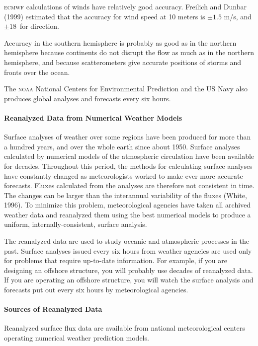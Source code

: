 \textsc{ecmwf} calculations of winds have relatively good
accuracy. Freilich and Dunbar (1999)
estimated that the accuracy for wind speed at 10 meters is $\pm 1.5$
m/s, and $\pm 18$\degrees\ for direction.

Accuracy in the southern hemisphere is probably as good as in the
northern hemisphere because continents do not disrupt the flow as much
as in the northern hemisphere, and because
scatterometers give accurate positions of storms
and fronts over the ocean.

The \textsc{noaa} National Centers for Environmental Prediction and
the US Navy also produces global analyses and forecasts every six
hours.

\paragraph{Reanalyzed Data from Numerical Weather Models}
Surface analyses of
weather over some regions have been produced for more than a hundred
years, and over the whole earth since about 1950. Surface analyses
calculated by numerical models of the atmospheric circulation have
been available for decades. Throughout this period, the methods for
calculating surface analyses have constantly changed as meteorologists
worked to make ever more accurate forecasts. Fluxes calculated from
the analyses are therefore not consistent in time. The changes can be
larger than the interannual variability of the fluxes (White,
1996). To minimize this problem, meteorological agencies have taken
all archived weather data and reanalyzed them using the best numerical
models to produce a uniform, internally-consistent, surface
analysis.

The reanalyzed data are used to study oceanic and atmospheric
processes in the past. Surface analyses issued
every six hours from weather agencies are used only for problems that
require up-to-date information. For example, if you are designing an
offshore structure, you will probably use decades of reanalyzed
data. If you are operating an offshore structure, you will watch the
surface analysis and forecasts put out every six hours by
meteorological agencies.

\paragraph{Sources of Reanalyzed Data}
Reanalyzed surface flux data are available from national
meteorological centers operating numerical weather prediction models.

